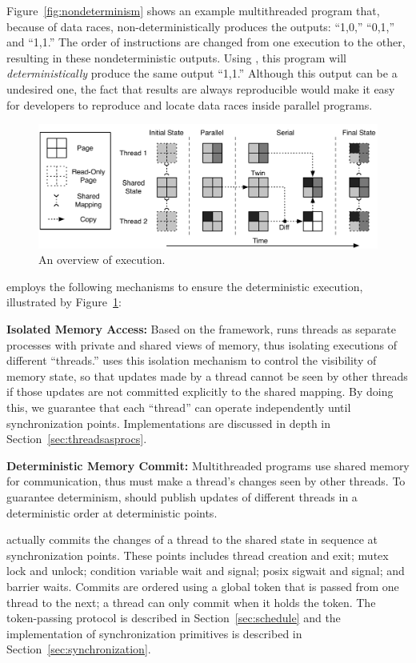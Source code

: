 Figure~\ref{fig:nondeterminism} shows an example multithreaded program that, because of data races, non-deterministically produces the outputs: ``1,0,'' ``0,1,'' and ``1,1.''  The order of instructions are changed from one execution to the other, resulting in these nondeterministic outputs. Using \dthreads{}, this program will \emph{deterministically} produce the same output ``1,1.'' Although this output can be a undesired one, the fact that results are always reproducible would make it easy for developers to reproduce and locate data races inside parallel programs.

\begin{figure}[h]
{\centering
\includegraphics[width=6in]{dthreads/figure/architecture-diagram}
\caption{An overview of \dthreads{} execution.\label{fig:architecture}}
}
\end{figure}

\dthreads{} employs the following mechanisms to ensure the deterministic execution, illustrated by Figure~\ref{fig:architecture}: 

\textbf{Isolated Memory Access:} Based on the \sheriff{} framework, \dthreads{} runs threads as separate processes with private and shared views of memory, thus isolating executions of different ``threads.'' \dthreads{} uses this isolation mechanism to control the visibility of memory state, so that updates made by a thread cannot be seen by other threads if those updates are not committed explicitly to the shared mapping. By doing this, we guarantee that each ``thread'' can operate independently until synchronization points. Implementations are discussed in depth in Section~\ref{sec:threadsasprocs}.

\textbf{Deterministic Memory Commit:} 
Multithreaded programs use shared memory for communication, thus \dthreads{} must make a thread's changes seen by other threads. To guarantee determinism, \dthreads{} should publish updates of different threads in a deterministic order at deterministic points.

\dthreads{} actually commits the changes of a thread to the shared state in sequence at synchronization points. These points includes thread creation and exit; mutex lock and unlock; condition variable wait and signal; posix sigwait and signal; and barrier waits. Commits are ordered using a global token that is passed from one thread to the next; a thread can only commit when it holds the token.  The token-passing protocol is described in Section~\ref{sec:schedule} and the implementation of synchronization primitives is described in Section~\ref{sec:synchronization}.

